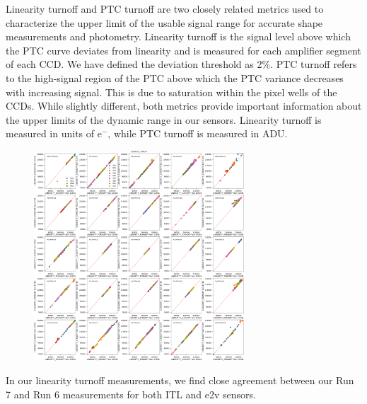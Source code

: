 Linearity turnoff and PTC turnoff are two closely related metrics used
to characterize the upper limit of the usable signal range for accurate shape measurements and photometry. Linearity turnoff is the signal level above which the PTC curve deviates from
linearity and is measured for each amplifier segment of each CCD. We have defined the deviation threshold as 2\%.
PTC turnoff refers to the high-signal region of the PTC above which the PTC
variance decreases with increasing signal. This is due to saturation within the pixel wells of the CCDs. While slightly different, both metrics
provide important information about the upper limits of the dynamic
range in our sensors. Linearity turnoff is measured in units of e$^-$,
while PTC turnoff is measured in ADU.

\begin{figure}[H]
\begin{centering}
\includegraphics[width=0.7\textwidth]{figures/baselineCharacterization/13591_E749_LINEARITY_TURNOFF.png}
\end{centering}
\end{figure}

In our linearity turnoff measurements, we find close agreement between
our Run 7 and Run 6 measurements for both ITL and e2v sensors.

